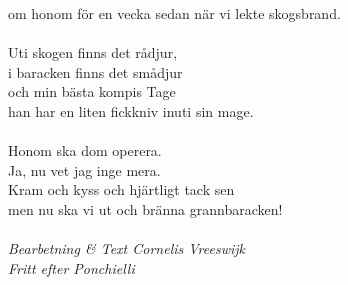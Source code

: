 om honom för en vecka sedan när vi lekte skogsbrand.\\
\\
Uti skogen finns det rådjur,\\
i baracken finns det smådjur\\
och min bästa kompis Tage\\
han har en liten fickkniv inuti sin mage.\\
\\
Honom ska dom operera.\\
Ja, nu vet jag inge mera.\\
Kram och kyss och hjärtligt tack sen\\
men nu ska vi ut och bränna grannbaracken!\\
\\
{\footnotesize\textit{Bearbetning \& Text Cornelis Vreeswijk \\ Fritt efter Ponchielli}}
